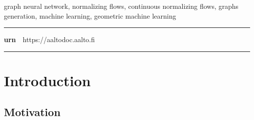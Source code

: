 \begin{spacing}{.88}
	{\parindent0pt %

	\parbox[t]{123.6mm}{\raggedright\small graph neural network, normalizing flows, continuous normalizing flows, graphs generation, machine learning, geometric machine learning}

	\vspace{.5mm}\rule{\textwidth}{.75pt}

	{\fontsize{10.5pt}{10.5pt}\bfseries\sffamily\lsstyle urn}~~{\small https://aaltodoc.aalto.fi}

	\vspace{-2.4mm}\rule{\textwidth}{.75pt}

	} %
\end{spacing}




\newpage

\tableofcontents


\newpage


\chapter*{Introduction}

\section{Motivation}

